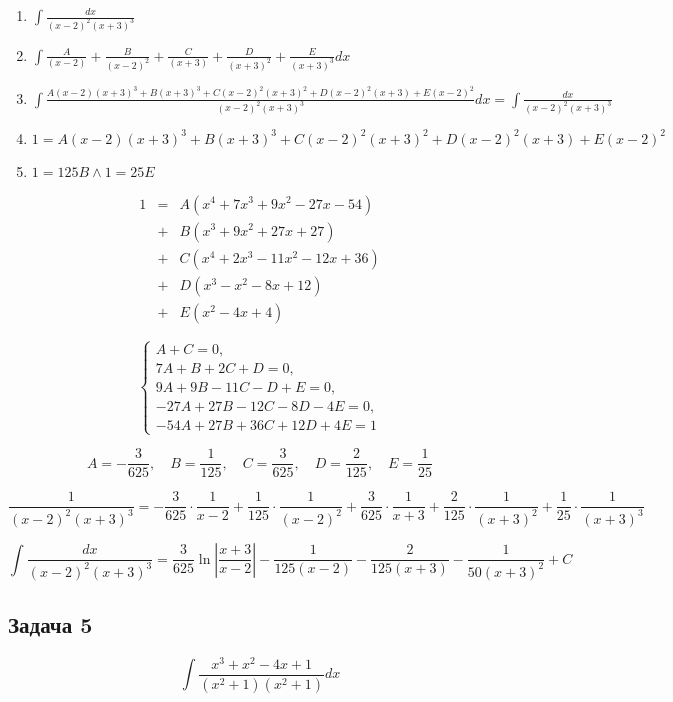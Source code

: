 \documentclass[a4paper,12pt]{article}
\begin{document}
\begin{enumerate}
    \item $\int \frac{dx}{(x-2)^2(x+3)^3}$
    \item $\int \frac{A}{(x-2)} + \frac{B}{(x-2)^2} + \frac{C}{(x+3)} + \frac{D}{(x+3)^2} + \frac{E}{(x+3)^3} dx$
    \item $ \int \frac{A(x-2)(x+3)^3 + B(x+3)^3 + C(x-2)^2(x+3)^2 + D(x-2)^2(x+3) + E(x-2)^2}{(x-2)^2 (x+3)^3} dx = \int \frac{dx}{(x-2)^2(x+3)^3}$
    \item $   1 = A(x-2)(x+3)^3 + B(x+3)^3 + C(x-2)^2(x+3)^2 + D(x-2)^2(x+3) + E(x-2)^2$
    \item $1 = 125B \land 1 = 25E$
\end{enumerate}
\[
\begin{array}{rcl}
        1 &=& A(x^4+7x^3+9x^2-27x-54)\\[1mm]
          &+& B(x^3+9x^2+27x+27)\\[1mm]
          &+& C(x^4+2x^3-11x^2-12x+36)\\[1mm]
          &+& D(x^3-x^2-8x+12)\\[1mm]
          &+& E(x^2-4x+4)
        \end{array}
\]

\[
    \begin{cases}
        A + C = 0, \\
        7A + B + 2C + D = 0, \\
        9A + 9B - 11C - D + E = 0, \\
        -27A + 27B - 12C - 8D - 4E = 0, \\
        -54A + 27B + 36C + 12D + 4E = 1
        \end{cases}
\]

\[
    A=-\frac{3}{625},\quad B=\frac{1}{125},\quad C=\frac{3}{625},\quad D=\frac{2}{125},\quad E=\frac{1}{25}
\]

\[
    \frac{1}{(x-2)^2(x+3)^3}=-\frac{3}{625}\cdot\frac{1}{x-2}+\frac{1}{125}\cdot\frac{1}{(x-2)^2}+\frac{3}{625}\cdot\frac{1}{x+3}+\frac{2}{125}\cdot\frac{1}{(x+3)^2}+\frac{1}{25}\cdot\frac{1}{(x+3)^3}
\]

\[
\int \frac{dx}{(x-2)^2(x+3)^3} = \frac{3}{625}\ln\left|\frac{x+3}{x-2}\right| - \frac{1}{125(x-2)}-\frac{2}{125(x+3)}-\frac{1}{50(x+3)^2}+C
\]

\subsection{Задача 5}
\[
\int \frac{x^3+x^2-4x+1}{(x^2+1)(x^2+1)}dx
\]
\end{document}
